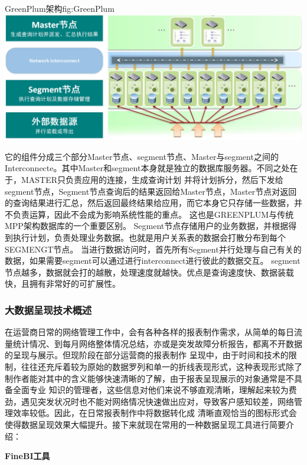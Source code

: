 \documentclass{HustGraduPaper}
\begin{document}
    \begin{generalfig}[htb]{GreenPlum架构}{fig:GreenPlum} 
        \includegraphics[width = \textwidth]{Figures/GreenPlum.png} 
    \end{generalfig}

    它的组件分成三个部分Master节点、segment节点、Master与segment之间的Interconnecte。其中Master和segment本身就是独立的数据库服务器。不同之处在于，MASTER只负责应用的连接，生成查询计划
    并将计划拆分，然后下发给segment节点，Segment节点查询后的结果返回给Master节点，Master节点对返回的查询结果进行汇总，然后返回最终结果给应用，而它本身它只存储一些数据，并不负责运算，因此不会成为影响系统性能的重点。
    这也是GREENPLUM与传统MPP架构数据库的一个重要区别。 Segment节点存储用户的业务数据，并根据得到执行计划，负责处理业务数据。也就是用户关系表的数据会打散分布到每个SEGMENGT节点。
    当进行数据访问时，首先所有Segment并行处理与自己有关的数据，如果需要segment可以通过进行interconnect进行彼此的数据交互。 segment节点越多，数据就会打的越散，处理速度就越快。优点是查询速度快、数据装载快，且拥有非常好的可扩展性。

    \subsubsection{大数据呈现技术概述}
    在运营商日常的网络管理工作中，会有各种各样的报表制作需求，从简单的每日流量统计情况、到每月网络整体情况总结，亦或是突发故障分析报告，都离不开数据的呈现与展示。但现阶段在部分运营商的报表制作
    呈现中，由于时间和技术的限制，往往还充斥着较为原始的数据罗列和单一的折线表现形式，这种表现形式除了制作者能对其中的含义能够快速清晰的了解，由于报表呈现展示的对象通常是不具备全面专业
    知识的管理者，这些信息对他们来说不够直观清晰，理解起来较为费劲，遇见突发状况时也不能对网络情况快速做出应对，导致客户感知较差，网络管理效率较低。因此，在日常报表制作中将数据转化成
    清晰直观恰当的图标形式会使得数据呈现效果大幅提升。接下来就现在常用的一种数据呈现工具进行简要介绍：

    {\songti \bfseries FineBI工具\\}
\end{document}

